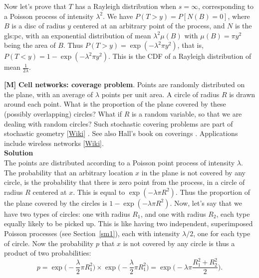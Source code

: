 \documentclass[10pt]{article}
\begin{document}
\begin{Exercise}
Now let's prove that $T$ has a Rayleigh distribution when $s=\infty$, corresponding to a Poisson process of intensity $\lambda^2$.  We have $P(T>y)=P[N(B)=0]$, where $B$ is a disc of radius $y$ centered at an arbitrary point of the process, and $N$ is the \gls{gls:pc}, with an exponential distribution of mean $\lambda^2\mu(B)$ with $\mu(B)=\pi y^2$ being the area of $B$. Thus
$P(T>y)=\exp(-\lambda^2\pi y^2)$, that is, $P(T<y)= 1 - \exp(-\lambda^2\pi y^2)$. This is the CDF of a Rayleigh distribution of mean $\frac{1}{2\lambda}$.
\end{Exercise}

\begin{Exercise}\label{exercise14c}{\bf [M]} 
{\bf Cell networks: coverage problem}. Points are randomly distributed on the plane, with an average of $\lambda$ points per unit area. A circle of radius $R$ is drawn around each point. What is the proportion of the plane covered by these (possibly overlapping) circles? What if $R$ is a random variable, so that we are dealing with random circles?  Such \textcolor{index}{stochastic covering problems} are part of \textcolor{index}{stochastic geometry} [\href{https://en.wikipedia.org/wiki/Stochastic_geometry}{Wiki}] \cite{davidc,stoyan}. See also Hall's book on coverings \cite{phall}. Applications include wireless networks [\href{https://en.wikipedia.org/wiki/Stochastic_geometry_models_of_wireless_networks}{Wiki}]. \vspace{1ex} \\
{\bf Solution} \vspace{1ex}   \\ 
The points are distributed according to a Poisson point process of intensity $\lambda$. The probability that an arbitrary location $x$ in the plane is not covered by any circle, is the probability that there is zero point from the process, in a circle of radius $R$ centered at $x$. This is equal to $\exp(-\lambda \pi R^2)$. Thus the proportion of the plane covered by the circles is $1-\exp(-\lambda \pi R^2)$. Now, let's say that we have two types of circles: one with radius $R_1$, and one with radius $R_2$, each type equally likely to be picked up. This is like having two independent, superimposed Poisson processes (see Section~\ref{sm1}), each with intensity $\lambda/2$, one for each type of circle. Now the probability $p$ that $x$ is not covered by any circle is thus a product of two probabilities:
$$ p = \exp\Big(-\frac{\lambda}{2}\pi R_1^2\Big)\times\exp\Big(-\frac{\lambda}{2}\pi R_1^2\Big)=\exp\Big(-\lambda\pi \frac{R_1^2 + R_2^2}{2}\Big).$$

\end{Exercise}
\end{document}
